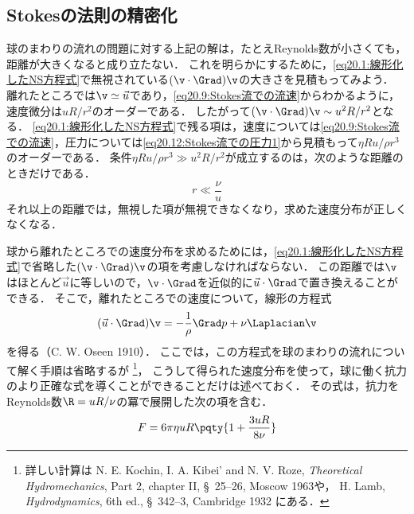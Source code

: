 \subsection*{Stokesの法則の精密化}
球のまわりの流れの問題に対する上記の解は，たとえReynolds数が小さくても，距離が大きくなると成り立たない．
これを明らかにするために，\eqref{eq20.1:線形化したNS方程式}で無視されている$(\v\cdot\Grad)\v$の大きさを見積もってみよう．
離れたところでは$\v\simeq\vec{u}$であり，\eqref{eq20.9:Stokes流での流速}からわかるように，速度微分は$uR/r^2$のオーダーである．
したがって$(\v\cdot\Grad)\v \sim u^2R/r^2$となる．
\eqref{eq20.1:線形化したNS方程式}で残る項は，速度については\eqref{eq20.9:Stokes流での流速}，圧力については\eqref{eq20.12:Stokes流での圧力1}から見積もって$\eta Ru/\rho r^3$のオーダーである．
条件$\eta Ru/\rho r^3 \gg u^2R/r^2$が成立するのは，次のような距離のときだけである．
\begin{equation}
    r \ll \frac{\nu}{u}
\end{equation}
それ以上の距離では，無視した項が無視できなくなり，求めた速度分布が正しくなくなる．




球から離れたところでの速度分布を求めるためには，\eqref{eq20.1:線形化したNS方程式}で省略した$(\v\cdot\Grad)\v$の項を考慮しなければならない．
この距離では$\v$はほとんど$\vec{u}$に等しいので，$\v\cdot\Grad$を近似的に$\vec{u}\cdot\Grad$で置き換えることができる．
そこで，離れたところでの速度について，線形の方程式
\begin{equation}\label{eq20.17:Oseen近似した定常NS方程式}
    (\vec{u}\cdot\Grad)\v = -\frac{1}{\rho} \Grad p + \nu \Laplacian\v
\end{equation}
を得る（C. W. Oseen 1910）．
ここでは，この方程式を球のまわりの流れについて解く手順は省略するが
\footnote{
詳しい計算は
N. E. Kochin, I. A. Kibei' and N. V. Roze, \textit{Theoretical Hydromechanics}, Part 2, chapter II, \S~25--26, Moscow 1963や，
H. Lamb, \textit{Hydrodynamics}, 6th ed., \S~342--3, Cambridge 1932
にある．
}，
こうして得られた速度分布を使って，球に働く抗力のより正確な式を導くことができることだけは述べておく．
その式は，抗力をReynolds数$\R = uR/\nu$の冪で展開した次の項を含む．
\begin{equation}\label{eq20.18:Stokesの法則の1次補正}
    F = 6\pi\eta uR\pqty{ 1 + \frac{3uR}{8\nu} }
\end{equation}


